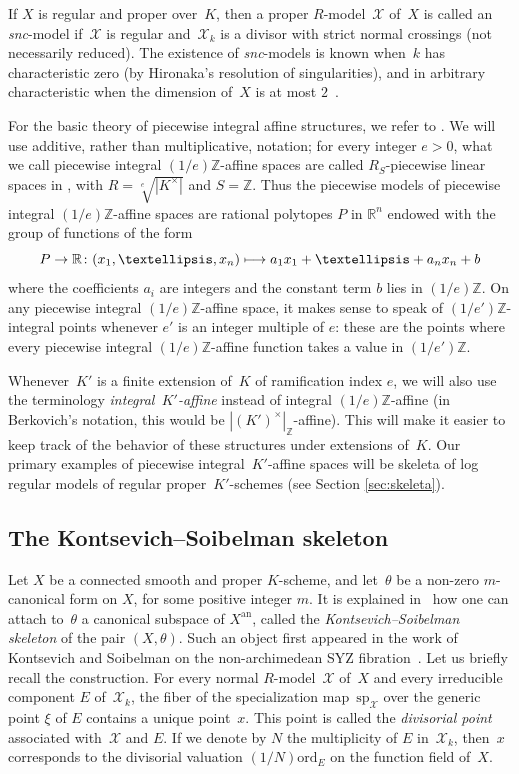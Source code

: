 \documentclass[11pt]{article}
\newcommand{\mto}{\mathchoice{\longmapsto}{\mapsto}{\mapsto}{\mapsto}}
\theoremstyle{definition}
\numberwithin{equation}{subsection}
\newcommand{\Z}{\ensuremath{\mathbb{Z}}}
\newcommand{\R}{\ensuremath{\mathbb{R}}}
\newcommand{\cX}{\ensuremath{\mathscr{X}}}
\newcommand{\snc}{\textit{snc}}
\newcommand{\an}{\mathrm{an}}
\newcommand{\ord}{\mathrm{ord}}
\newcommand{\spe}{\mathrm{sp}}
\let\form\theta
\begin{document}
If $X$ is regular and proper over~$K$, then a proper $R$\nobreakdash-model~$\cX$ of~$X$ is called an \snc-model if~$\cX$ is regular and~$\cX_k$ is a divisor with strict normal crossings (not necessarily reduced). The existence of \snc-models is known when~$k$ has characteristic zero (by Hironaka's resolution of singularities), and in arbitrary characteristic when the dimension of~$X$ is at most $2$~\cite{CJS, cossart-piltant}.

For the basic theory of piecewise integral affine structures, we refer to
\cite[\S1]{BerkContractII}. We will use additive, rather than multiplicative, notation;
for every integer $e>0$,
what we call piecewise integral $(1/e)\Z$-affine spaces are called $R_S$-piecewise linear spaces in \cite[\S1]{BerkContractII}, with $R=\sqrt[e]{|K^{\times}|}$ and
$S=\Z$. Thus the piecewise models of
piecewise integral $(1/e)\Z$-affine spaces are rational polytopes $P$ in $\R^n$ endowed with the group of functions of the form
\[
P\to \R\colon (x_1,\ldots,x_n)\mto a_1x_1+\ldots+a_nx_n+b
\]
where the coefficients $a_i$ are integers and the constant term $b$ lies in $(1/e)\Z$.
On any piecewise integral $(1/e)\Z$-affine space, it makes sense to speak of $(1/e')\Z$-integral points whenever $e'$ is an integer multiple of $e$: these are the points where every piecewise integral $(1/e)\Z$-affine function takes a value in $(1/e')\Z$.

Whenever~$K'$ is a finite extension of~$K$ of ramification index $e$, we will also use the terminology {\em integral~$K'$-affine}
instead of integral $(1/e)\Z$-affine (in Berkovich's notation, this would be $|(K')^{\times}|_{\Z}$-affine).
This will make it easier to keep track of the behavior of these structures under extensions of~$K$. Our primary examples of
piecewise integral~$K'$-affine spaces will be skeleta of log regular models of regular proper~$K'$-schemes (see Section \ref{sec:skeleta}).

\subsection{The Kontsevich--Soibelman skeleton}\label{ss:KS}
Let $X$ be a connected smooth and proper $K$\nobreakdash-scheme, and let~$\form$ be a non-zero $m$-canonical form on $X$, for some positive integer $m$.
It is explained in~\cite{MuNi} how one can attach to~$\form$ a canonical subspace of $X^{\an}$, called the {\em Kontsevich--Soibelman skeleton} of the pair $(X,\form)$.
Such an object first appeared in the work of Kontsevich and Soibelman on the non-archimedean SYZ fibration~\cite{KS}. Let us briefly recall the construction. For every normal $R$\nobreakdash-model~$\cX$ of~$X$ and every irreducible component $E$ of~$\cX_k$, the fiber of the specialization map~$\spe_{\cX}$ over the generic point $\xi$ of $E$ contains a unique point~$x$. This point is called the {\em divisorial point} associated with~$\cX$ and $E$. If we denote by $N$ the multiplicity of $E$ in~$\cX_k$, then~$x$ corresponds to the divisorial valuation $(1/N)\ord_E$ on the function field of~$X$.
\end{document}
